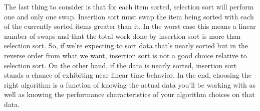 \documentclass[]{tufte-handout}
\begin{document}
The last thing to consider is that for each item sorted, selection sort will perform one and only one swap. Insertion sort must swap the item being sorted with each of the currently sorted items greater than it. In the worst case this means a linear number of swaps and that the total work done by insertion sort is more than selection sort. So, if we're expecting to sort data that's nearly sorted but in the reverse order from what we want, insertion sort is not a good choice relative to selection sort. On the other hand, if the data is nearly sorted, insertion sort stands a chance of exhibiting near linear time behavior. In the end, choosing the right algorithm is a function of knowing the actual data you'll be working with as well as knowing the performance characteristics of your algorithm choices on that data. 
\end{document}

